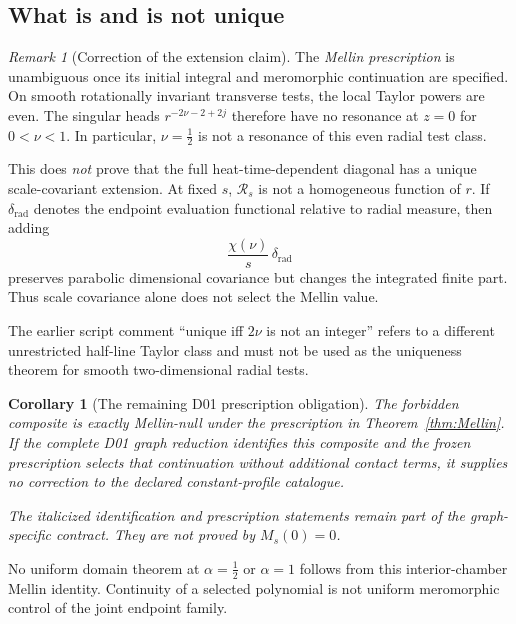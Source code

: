 \documentclass[11pt,a4paper]{article}
\theoremstyle{plain}
\newtheorem{corollary}[theorem]{Corollary}
\theoremstyle{definition}
\theoremstyle{remark}
\newtheorem{remark}[theorem]{Remark}
\numberwithin{equation}{section}
\begin{document}
\subsection{What is and is not unique}

\begin{remark}[Correction of the extension claim]
\label{rem:extension}
The \emph{Mellin prescription} is unambiguous once its initial
integral and meromorphic continuation are specified.
On smooth rotationally invariant transverse tests, the local
Taylor powers are even. The singular heads
\(r^{-2\nu-2+2j}\) therefore have no resonance at \(z=0\)
for \(0<\nu<1\). In particular, \(\nu=\tfrac12\) is not a
resonance of this even radial test class.

This does \emph{not} prove that the full heat-time-dependent
diagonal has a unique scale-covariant extension.
At fixed \(s\), \(\mathcal R_s\) is not a homogeneous function
of \(r\). If \(\delta_{\mathrm{rad}}\) denotes the endpoint
evaluation functional relative to radial measure, then adding
\[
 \frac{\chi(\nu)}s\,\delta_{\mathrm{rad}}
\]
preserves parabolic dimensional covariance but changes the
integrated finite part.
Thus scale covariance alone does not select the Mellin value.

The earlier script comment ``unique iff \(2\nu\) is not an
integer'' refers to a different unrestricted half-line Taylor
class and must not be used as the uniqueness theorem for smooth
two-dimensional radial tests.
\end{remark}

\begin{corollary}[The remaining D01 prescription obligation]
\label{cor:D01}
The forbidden composite is exactly Mellin-null under the
prescription in Theorem~\ref{thm:Mellin}. If the complete D01
graph reduction identifies this composite and the frozen
prescription selects that continuation without additional
contact terms, it supplies no correction to the declared
constant-profile catalogue.

The italicized identification and prescription statements remain
part of the graph-specific contract. They are not proved by
\(M_s(0)=0\).
\end{corollary}

No uniform domain theorem at \(\alpha=\tfrac12\) or
\(\alpha=1\) follows from this interior-chamber Mellin identity.
Continuity of a selected polynomial is not uniform meromorphic
control of the joint endpoint family.

\end{document}
